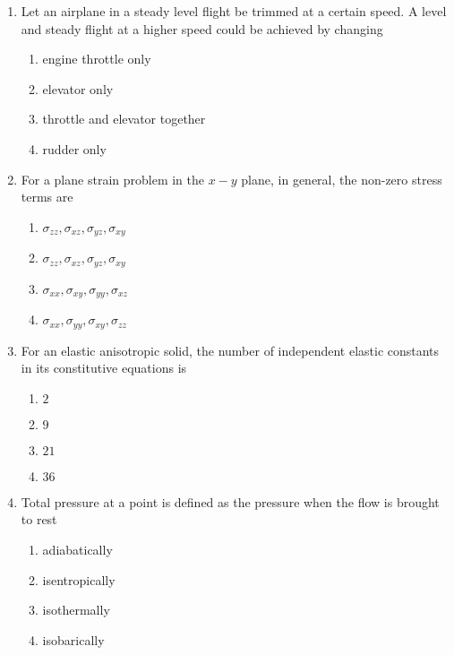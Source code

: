 \documentclass[journal]{IEEEtran}
\begin{document}
\begin{enumerate}
\item Let an airplane in a steady level flight be trimmed at a certain speed. A level and steady flight at a higher speed could be achieved by changing
\begin{multicols}{2}
\begin{enumerate}
\item engine throttle only
\item elevator only
\item throttle and elevator together
\item rudder only
\end{enumerate}
\end{multicols}


\item For a plane strain problem in the $x-y$ plane, in general, the non-zero stress terms are
\begin{multicols}{2}
\begin{enumerate}
\item $\sigma_{zz},\sigma_{xz},\sigma_{yz},\sigma_{xy}$
\item $\sigma_{zz},\sigma_{xz},\sigma_{yz},\sigma_{xy}$
\item $\sigma_{xx},\sigma_{xy},\sigma_{yy},\sigma_{xz}$
\item $\sigma_{xx},\sigma_{yy},\sigma_{xy},\sigma_{zz}$
\end{enumerate}
\end{multicols}


\item For an elastic anisotropic solid, the number of independent elastic constants in its constitutive equations is
\begin{multicols}{2}
\begin{enumerate}
\item $2$
\item $9$
\item $21$
\item $36$
\end{enumerate}
\end{multicols}


\item Total pressure at a point is defined as the pressure when the flow is brought to rest
\begin{multicols}{2}
\begin{enumerate}
\item adiabatically
\item isentropically
\item isothermally
\item isobarically
\end{enumerate}
\end{multicols}



\end{enumerate}
\end{document}

